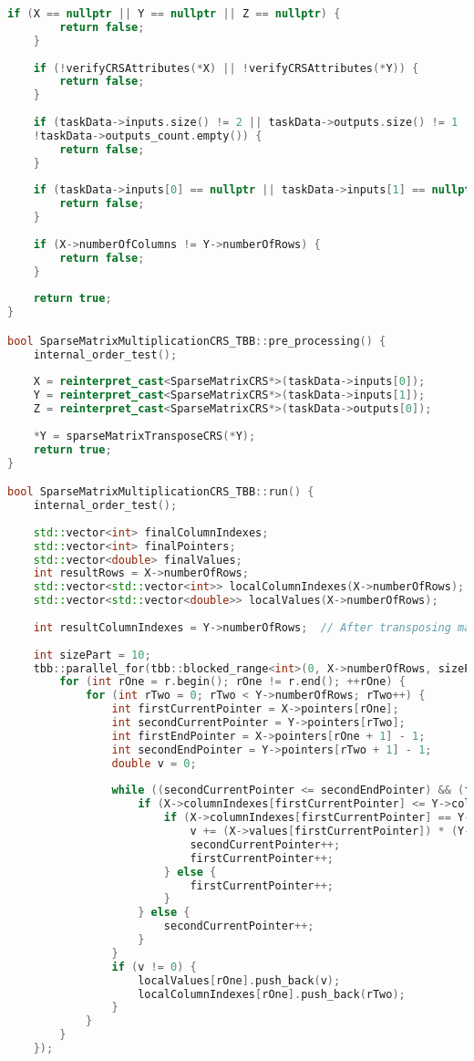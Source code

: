 \documentclass[a4paper, 14pt]{article}
\theoremstyle{plain}
\begin{document}
\begin{lstlisting}[language=C++,caption=Файл sparse\_matmult\_crs\_tbb.cpp]
	if (X == nullptr || Y == nullptr || Z == nullptr) {
		return false;
	}
	
	if (!verifyCRSAttributes(*X) || !verifyCRSAttributes(*Y)) {
		return false;
	}
	
	if (taskData->inputs.size() != 2 || taskData->outputs.size() != 1 || !taskData->inputs_count.empty() ||
	!taskData->outputs_count.empty()) {
		return false;
	}
	
	if (taskData->inputs[0] == nullptr || taskData->inputs[1] == nullptr || taskData->outputs[0] == nullptr) {
		return false;
	}
	
	if (X->numberOfColumns != Y->numberOfRows) {
		return false;
	}
	
	return true;
}

bool SparseMatrixMultiplicationCRS_TBB::pre_processing() {
	internal_order_test();
	
	X = reinterpret_cast<SparseMatrixCRS*>(taskData->inputs[0]);
	Y = reinterpret_cast<SparseMatrixCRS*>(taskData->inputs[1]);
	Z = reinterpret_cast<SparseMatrixCRS*>(taskData->outputs[0]);
	
	*Y = sparseMatrixTransposeCRS(*Y);
	return true;
}

bool SparseMatrixMultiplicationCRS_TBB::run() {
	internal_order_test();
	
	std::vector<int> finalColumnIndexes;
	std::vector<int> finalPointers;
	std::vector<double> finalValues;
	int resultRows = X->numberOfRows;
	std::vector<std::vector<int>> localColumnIndexes(X->numberOfRows);
	std::vector<std::vector<double>> localValues(X->numberOfRows);
	
	int resultColumnIndexes = Y->numberOfRows;  // After transposing matrix Y
	
	int sizePart = 10;
	tbb::parallel_for(tbb::blocked_range<int>(0, X->numberOfRows, sizePart), [&](tbb::blocked_range<int> r) {
		for (int rOne = r.begin(); rOne != r.end(); ++rOne) {
			for (int rTwo = 0; rTwo < Y->numberOfRows; rTwo++) {
				int firstCurrentPointer = X->pointers[rOne];
				int secondCurrentPointer = Y->pointers[rTwo];
				int firstEndPointer = X->pointers[rOne + 1] - 1;
				int secondEndPointer = Y->pointers[rTwo + 1] - 1;
				double v = 0;
				
				while ((secondCurrentPointer <= secondEndPointer) && (firstCurrentPointer <= firstEndPointer)) {
					if (X->columnIndexes[firstCurrentPointer] <= Y->columnIndexes[secondCurrentPointer]) {
						if (X->columnIndexes[firstCurrentPointer] == Y->columnIndexes[secondCurrentPointer]) {
							v += (X->values[firstCurrentPointer]) * (Y->values[secondCurrentPointer]);
							secondCurrentPointer++;
							firstCurrentPointer++;
						} else {
							firstCurrentPointer++;
						}
					} else {
						secondCurrentPointer++;
					}
				}
				if (v != 0) {
					localValues[rOne].push_back(v);
					localColumnIndexes[rOne].push_back(rTwo);
				}
			}
		}
	});
	

\end{lstlisting}
\end{document}
